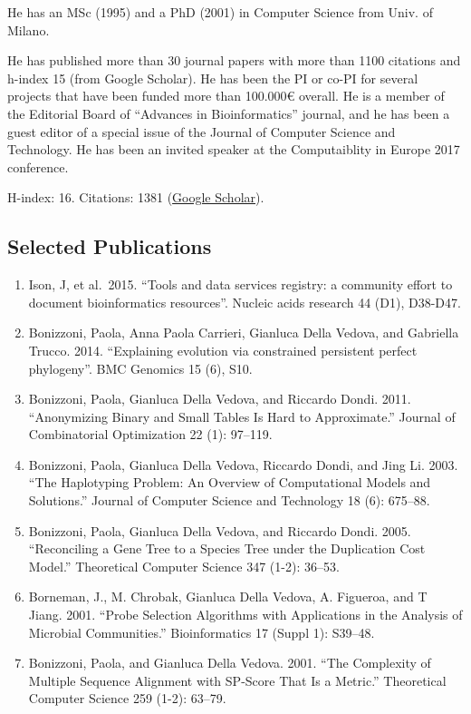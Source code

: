 \documentclass[
]{article}
\providecommand{\tightlist}{%
  \setlength{\itemsep}{0pt}\setlength{\parskip}{0pt}}
\begin{document}
He has an MSc (1995) and a PhD (2001) in Computer Science from Univ. of
Milano.

He has published more than 30 journal papers with more than 1100
citations and h-index 15 (from Google Scholar). He has been the PI or
co-PI for several projects that have been funded more than 100.000€
overall. He is a member of the Editorial Board of ``Advances in
Bioinformatics'' journal, and he has been a guest editor of a special
issue of the Journal of Computer Science and Technology. He has been an
invited speaker at the Computaiblity in Europe 2017 conference.

H-index: 16. Citations: 1381
(\href{https://scholar.google.com/citations?user=0gaIFokAAAAJ\&hl=en\&oi=ao}{Google
Scholar}).

\hypertarget{selected-publications}{%
\subsection{Selected Publications}\label{selected-publications}}

\begin{enumerate}
\def\labelenumi{\arabic{enumi}.}
\setcounter{enumi}{4}
\tightlist
\item
  Ison, J, et al.~2015. ``Tools and data services registry: a community
  effort to document bioinformatics resources''. Nucleic acids research
  44 (D1), D38-D47.
\item
  Bonizzoni, Paola, Anna Paola Carrieri, Gianluca Della Vedova, and
  Gabriella Trucco. 2014. ``Explaining evolution via constrained
  persistent perfect phylogeny''. BMC Genomics 15 (6), S10.
\item
  Bonizzoni, Paola, Gianluca Della Vedova, and Riccardo Dondi. 2011.
  ``Anonymizing Binary and Small Tables Is Hard to Approximate.''
  Journal of Combinatorial Optimization 22 (1): 97--119.
\item
  Bonizzoni, Paola, Gianluca Della Vedova, Riccardo Dondi, and Jing Li.
  2003. ``The Haplotyping Problem: An Overview of Computational Models
  and Solutions.'' Journal of Computer Science and Technology 18 (6):
  675--88.
\item
  Bonizzoni, Paola, Gianluca Della Vedova, and Riccardo Dondi. 2005.
  ``Reconciling a Gene Tree to a Species Tree under the Duplication Cost
  Model.'' Theoretical Computer Science 347 (1-2): 36--53.
\item
  Borneman, J., M. Chrobak, Gianluca Della Vedova, A. Figueroa, and T
  Jiang. 2001. ``Probe Selection Algorithms with Applications in the
  Analysis of Microbial Communities.'' Bioinformatics 17 (Suppl 1):
  S39--48.
\item
  Bonizzoni, Paola, and Gianluca Della Vedova. 2001. ``The Complexity of
  Multiple Sequence Alignment with SP-Score That Is a Metric.''
  Theoretical Computer Science 259 (1-2): 63--79.
\end{enumerate}
\end{document}

